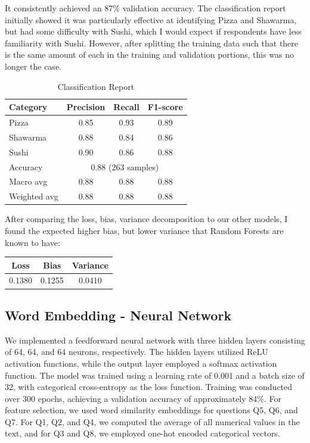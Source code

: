 It consistently achieved an 87\% validation accuracy. The classification report initially showed it was particularly effective at identifying Pizza and Shawarma, but had some difficulty with Sushi, which I would expect if respondents have less familiarity with Sushi. However, after splitting the training data such that there is the same amount of each in the training and validation portions, this was no longer the case.
\begin{table}[ht]
    \centering
    \begin{tabular}{lccc}
        \hline
        Category     & Precision                              & Recall & F1-score \\
        \hline
        Pizza        & 0.85                                   & 0.93   & 0.89     \\
        Shawarma     & 0.88                                   & 0.84   & 0.86     \\
        Sushi        & 0.90                                   & 0.86   & 0.88     \\
        \hline
        Accuracy     & \multicolumn{3}{c}{0.88 (263 samples)}                     \\
        Macro avg    & 0.88                                   & 0.88   & 0.88     \\
        Weighted avg & 0.88                                   & 0.88   & 0.88     \\
        \hline
    \end{tabular}
    \caption{Classification Report}
    \label{tab:classification_report}
\end{table}

After comparing the loss, bias, variance decomposition to our other models, I found the expected higher bias, but lower variance that Random Forests are known to have:
\begin{table}[ht]
    \centering
    \begin{tabular}{ccc}
        \hline
        Loss   & Bias   & Variance \\
        \hline
        0.1380 & 0.1255 & 0.0410   \\
        \hline
    \end{tabular}
    \label{tab:loss_report}
\end{table}

\subsection{Word Embedding - Neural Network}
We implemented a feedforward neural network with three hidden layers consisting of 64, 64, and 64 neurons, respectively. The hidden layers utilized ReLU activation functions, while the output layer employed a softmax activation function. The model was trained using a learning rate of 0.001 and a batch size of 32, with categorical cross-entropy as the loss function. Training was conducted over 300 epochs, achieving a validation accuracy of approximately 84\%. For feature selection, we used word similarity embeddings for questions Q5, Q6, and Q7. For Q1, Q2, and Q4, we computed the average of all numerical values in the text, and for Q3 and Q8, we employed one-hot encoded categorical vectors.

